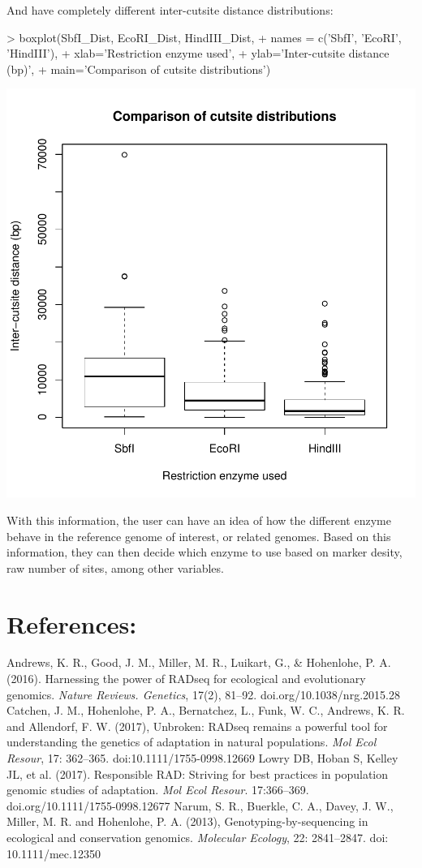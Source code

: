 \documentclass{article}
\begin{document}
And have completely different inter-cutsite distance distributions:
\begin{Schunk}
\begin{Sinput}
> boxplot(SbfI_Dist, EcoRI_Dist, HindIII_Dist,
+         names = c('SbfI', 'EcoRI', 'HindIII'),
+         xlab='Restriction enzyme used',
+         ylab='Inter-cutsite distance (bp)',
+         main='Comparison of cutsite distributions')
\end{Sinput}
\end{Schunk}
\includegraphics{Tutorial_for_RADseq_Tools-023}

With this information, the user can have an idea of how the different enzyme behave in the reference genome of interest, or related genomes. Based on this information, they can then decide which enzyme to use based on marker desity, raw number of sites, among other variables. 

\section{References:}


\footnotesize Andrews, K. R., Good, J. M., Miller, M. R., Luikart, G., \& Hohenlohe, P. A. (2016). Harnessing the power of RADseq for ecological and evolutionary genomics. \emph{Nature Reviews. Genetics}, 17(2), 81–92. doi.org/10.1038/nrg.2015.28
\bigbreak
\footnotesize Catchen, J. M., Hohenlohe, P. A., Bernatchez, L., Funk, W. C., Andrews, K. R. and Allendorf, F. W. (2017), Unbroken: RADseq remains a powerful tool for understanding the genetics of adaptation in natural populations. \emph{Mol Ecol Resour}, 17: 362–365. doi:10.1111/1755-0998.12669
\bigbreak
\footnotesize Lowry DB, Hoban S, Kelley JL, et al. (2017). Responsible RAD: Striving for best practices in population genomic studies of adaptation. \emph{Mol Ecol Resour}. 17:366–369. doi.org/10.1111/1755-0998.12677
\bigbreak
\footnotesize Narum, S. R., Buerkle, C. A., Davey, J. W., Miller, M. R. and Hohenlohe, P. A. (2013), Genotyping-by-sequencing in ecological and conservation genomics. \emph{Molecular Ecology}, 22: 2841–2847. doi: 10.1111/mec.12350
\end{document}
